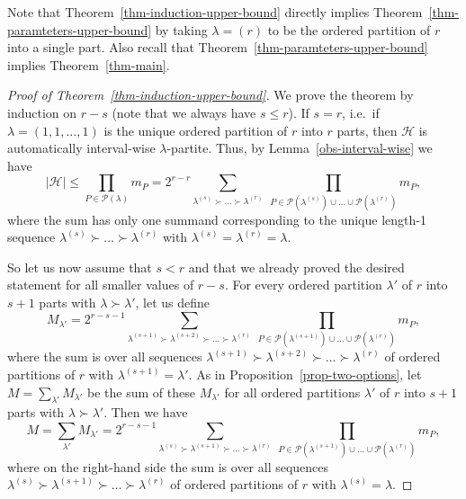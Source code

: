 \documentclass{aic}
\theoremstyle{definition}
\numberwithin{equation}{section}
\numberwithin{figure}{section}
\newcommand{\HH}{\mathcal{H}}
\newcommand{\PP}{\mathcal{P}}
\begin{document}
Note that Theorem~\ref{thm-induction-upper-bound} directly implies Theorem~\ref{thm-paramteters-upper-bound} by taking $\lambda=(r)$ to be the ordered partition of $r$ into a single part. Also recall that Theorem~\ref{thm-paramteters-upper-bound} implies Theorem~\ref{thm-main}.

\begin{proof}[Proof of Theorem~\ref{thm-induction-upper-bound}]
    We prove the theorem by induction on $r-s$ (note that we always have $s\le r$). If $s=r$, i.e.\ if $\lambda=(1,1,\dots,1)$ is the unique ordered partition of $r$ into $r$ parts, then $\HH$ is automatically interval-wise $\lambda$-partite. Thus, by Lemma~\ref{obs-interval-wise} we have
    \[|\HH|\le \prod_{P\in \PP(\lambda)} m_{P}=2^{r-r} \sum_{\lambda^{(s)} \succ \dots \succ \lambda^{(r)}}\  \prod_{P\in \PP(\lambda^{(s)})\cup\dots\cup \PP(\lambda^{(r)})} m_{P},\]
    where the sum has only one summand corresponding to the unique length-1 sequence $\lambda^{(s)} \succ \dots \succ \lambda^{(r)}$ with $\lambda^{(s)}=\lambda^{(r)}=\lambda$.

    So let us now assume that $s<r$ and that we already proved the desired statement for all smaller values of $r-s$.  For every ordered partition $\lambda'$ of $r$ into $s+1$ parts with $\lambda\succ\lambda'$, let us define
    \[M_{\lambda'}=2^{r-s-1} \sum_{\lambda^{(s+1)} \succ \lambda^{(s+2)} \succ \dots \succ \lambda^{(r)}}\ \prod_{P\in \PP(\lambda^{(s+1)})\cup\dots\cup \PP(\lambda^{(r)})} m_{P},\]
    where the sum is over all sequences $\lambda^{(s+1)} \succ \lambda^{(s+2)} \succ \dots \succ \lambda^{(r)}$ of ordered partitions of $r$ with $\lambda^{(s+1)}=\lambda'$. As in Proposition~\ref{prop-two-options}, let $M=\sum_{\lambda'}M_{\lambda'}$ be the sum of these $M_{\lambda'}$ for all ordered partitions $\lambda'$ of $r$ into $s+1$ parts with $\lambda\succ\lambda'$. Then we have
    \[M=\sum_{\lambda'} M_{\lambda'}=2^{r-s-1} \sum_{\lambda^{(s)}\succ \lambda^{(s+1)}\succ \dots \succ \lambda^{(r)}}\ \prod_{ P\in \PP(\lambda^{(s+1)})\cup\dots\cup \PP(\lambda^{(r)}) } m_{P},\]
    where on the right-hand side the sum is over all sequences $\lambda^{(s)} \succ \lambda^{(s+1)} \succ \dots \succ \lambda^{(r)}$ of ordered partitions of $r$ with $\lambda^{(s)}=\lambda$.


\end{proof}
\end{document}
